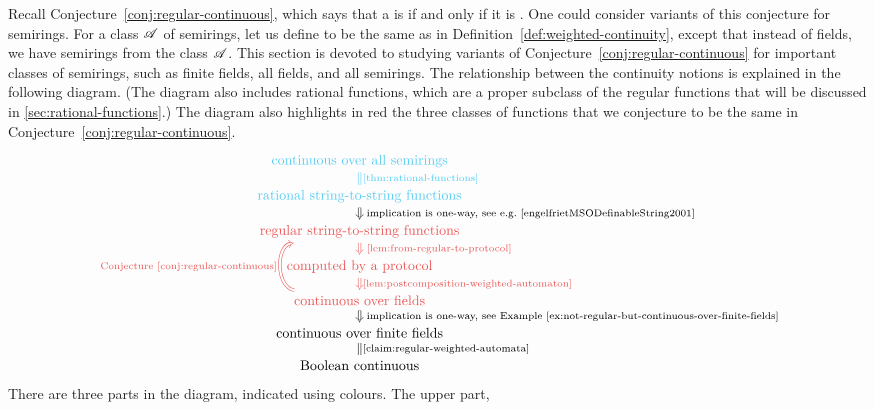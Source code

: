\AP
Recall Conjecture~\ref{conj:regular-continuous}, which says that a
 is  if and only if it is
. One could consider variants of this conjecture for
semirings.  For a class $\mathscr A$ of semirings, let us define
 to be the same as in
Definition~\ref{def:weighted-continuity}, except that instead of fields, we
have semirings from the class $\mathscr A$. This section is devoted to studying
variants of Conjecture~\ref{conj:regular-continuous} for  important classes of
semirings, such as finite fields, all fields,  and all semirings. The
relationship between the continuity notions is explained in the following
diagram. (The diagram also includes rational functions, which are a proper
subclass of the regular functions that will be discussed in
\cref{sec:rational-functions}.) The diagram also highlights in red the three
classes of functions that we conjecture to be the same in
Conjecture~\ref{conj:regular-continuous}. 
\[
\begin{tikzcd}[row sep=small]
 \text{\blue{continuous over all semirings}}
\arrow[d,blue, equal,"\text{\cref{thm:rational-functions}}"]
\\
 \text{\blue{rational string-to-string functions}}
\ar[d,Rightarrow,"\text{ implication is one-way,  see e.g.~\cite[p. 218]{engelfrietMSODefinableString2001}}"]
\\
 \text{\red{regular string-to-string functions}}
\ar[d,red,Rightarrow,"\text{ \cref{lem:from-regular-to-protocol}}"]
\\
% 
 \text{\red{computed by a protocol}}
\ar[d,red,Rightarrow,"\text{\cref{lem:postcomposition-weighted-automaton}}"]
\\
 \text{\red{continuous over fields}}
\ar[uu, red, bend left=80,Rightarrow,"\text{ Conjecture~\ref{conj:regular-continuous}}"]
\ar[d,Rightarrow,"\text{ implication is one-way, see Example~\ref{ex:not-regular-but-continuous-over-finite-fields}}"]
\\
 \text{continuous over finite fields}
\arrow[d,equal,"\text{\cref{claim:regular-weighted-automata}}"]
\\
 \text{Boolean continuous}
\end{tikzcd}
\]
There are three parts in the diagram, indicated using colours. The upper part,
